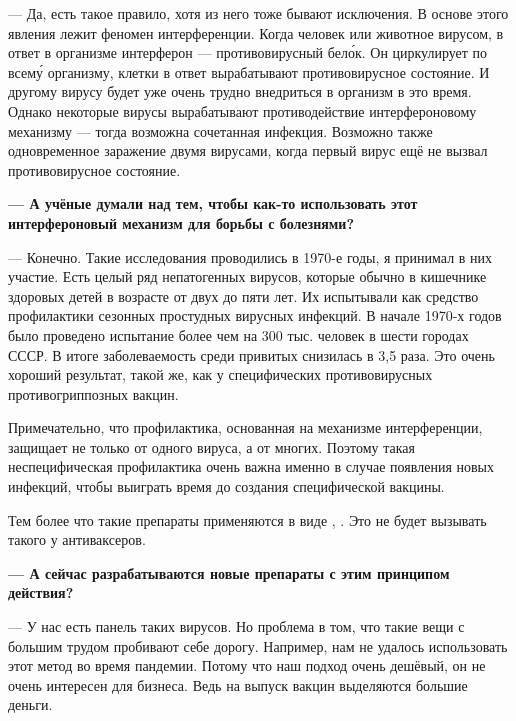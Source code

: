 --- Да, есть такое правило, хотя из него тоже бывают исключения. В основе этого явления лежит феномен интерференции. Когда человек или животное  вирусом, в ответ в организме  интерферон --- противовирусный бел\'{о}к. Он циркулирует по всем\'{у} организму, клетки в ответ вырабатывают противовирусное состояние. И другому вирусу будет уже очень трудно внедриться в организм в это время. Однако некоторые вирусы вырабатывают противодействие интерфероновому механизму --- тогда возможна сочетанная инфекция. Возможно также одновременное заражение двумя вирусами, когда первый вирус ещё не вызвал противовирусное состояние.

{\bf --- А учёные думали над тем, чтобы как-то использовать этот интерфероновый механизм для борьбы с болезнями?}

--- Конечно. Такие исследования проводились в 1970-е годы, я принимал в них участие. Есть целый ряд непатогенных вирусов, которые обычно  в кишечнике здоровых детей в возрасте от двух до пяти лет. Их испытывали как средство профилактики сезонных простудных вирусных инфекций. В начале 1970-х годов было проведено  испытание более чем на 300 тыс. человек в шести городах СССР. В итоге заболеваемость  среди привитых снизилась в 3,5 раза. Это очень хороший результат, такой же, как у специфических противовирусных противогриппозных вакцин.

\begin{fancyquotes}
    Примечательно, что профилактика, основанная на механизме интерференции, защищает не только от одного вируса, а от многих. Поэтому такая неспецифическая профилактика очень важна именно в случае появления новых инфекций, чтобы выиграть время до создания специфической вакцины.
\end{fancyquotes}

Тем более что такие препараты применяются в виде , . Это не будет вызывать такого  у антиваксеров.

{\bf --- А сейчас разрабатываются новые препараты с этим принципом действия?}

--- У нас есть панель таких вирусов. Но проблема в том, что такие вещи с большим трудом пробивают себе дорогу. Например, нам не удалось  использовать этот метод во время  пандемии. Потому что наш подход очень дешёвый, он не очень интересен для бизнеса. Ведь на выпуск вакцин выделяются большие деньги.


